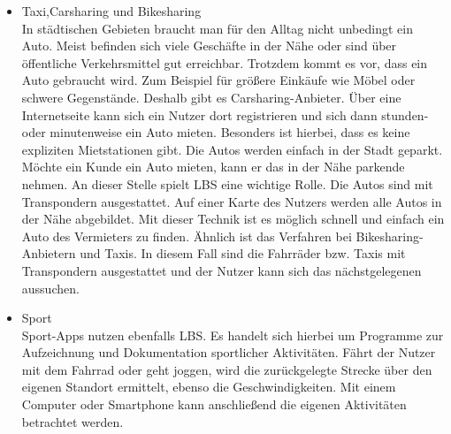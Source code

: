 \begin{itemize}
	
	\item Taxi,Carsharing und Bikesharing\\
	In städtischen Gebieten braucht man für den Alltag nicht unbedingt ein Auto. Meist befinden sich viele Geschäfte in der Nähe oder sind über öffentliche Verkehrsmittel gut erreichbar. Trotzdem kommt es vor, dass ein Auto gebraucht wird. Zum Beispiel für größere Einkäufe wie Möbel oder schwere Gegenstände. Deshalb gibt es Carsharing-Anbieter. Über eine Internetseite kann sich ein Nutzer dort registrieren und sich dann stunden- oder minutenweise ein Auto mieten. Besonders ist hierbei, dass es keine expliziten Mietstationen gibt. Die Autos werden einfach in der Stadt geparkt. Möchte ein Kunde ein Auto mieten, kann er das in der Nähe parkende nehmen. An dieser Stelle spielt LBS eine wichtige Rolle. Die Autos sind mit Transpondern ausgestattet. Auf einer Karte des Nutzers werden alle Autos in der Nähe abgebildet. Mit dieser Technik ist es möglich schnell und einfach ein Auto des Vermieters zu finden. Ähnlich ist das Verfahren bei Bikesharing-Anbietern und Taxis. In diesem Fall sind die Fahrräder bzw. Taxis mit Transpondern ausgestattet und der Nutzer kann sich das nächstgelegenen aussuchen.
	\item Sport\\
	Sport-Apps nutzen ebenfalls LBS. Es handelt sich hierbei um Programme zur Aufzeichnung und Dokumentation sportlicher Aktivitäten. Fährt der Nutzer mit dem Fahrrad oder geht joggen, wird die zurückgelegte Strecke über den eigenen Standort ermittelt, ebenso die Geschwindigkeiten. Mit einem Computer oder Smartphone kann anschließend die eigenen Aktivitäten betrachtet werden. 
\end{itemize}

